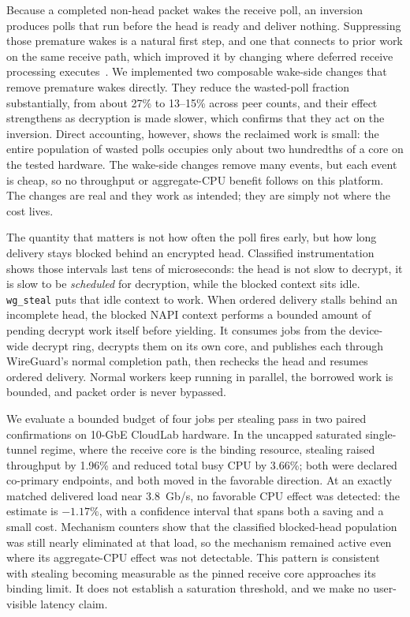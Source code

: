 Because a completed non-head packet wakes the receive poll, an inversion
produces polls that run before the head is ready and deliver nothing.
Suppressing those premature wakes is a natural first step, and one that connects
to prior work on the same receive path, which improved it by changing where
deferred receive processing executes~\cite{mounah2025}. We implemented two
composable wake-side changes that remove premature wakes directly. They reduce
the wasted-poll fraction substantially, from about 27\% to 13--15\% across peer
counts, and their effect strengthens as decryption is made slower, which
confirms that they act on the inversion. Direct accounting, however, shows the
reclaimed work is small: the entire population of wasted polls occupies only
about two hundredths of a core on the tested hardware. The wake-side changes
remove many events, but each event is cheap, so no throughput or aggregate-CPU
benefit follows on this platform. The changes are real and they work as
intended; they are simply not where the cost lives.

The quantity that matters is not how often the poll fires early, but how long
delivery stays blocked behind an encrypted head. Classified instrumentation
shows those intervals last tens of microseconds: the head is not slow to
decrypt, it is slow to be \emph{scheduled} for decryption, while the blocked
context sits idle. \texttt{wg\_steal} puts that idle context to work. When
ordered delivery stalls behind an incomplete head, the blocked NAPI context
performs a bounded amount of pending decrypt work itself before yielding. It
consumes jobs from the device-wide decrypt ring, decrypts them on its own core,
and publishes each through WireGuard's normal completion path, then rechecks the
head and resumes ordered delivery. Normal workers keep running in parallel, the
borrowed work is bounded, and packet order is never bypassed.

We evaluate a bounded budget of four jobs per stealing pass in two paired
confirmations on 10-GbE CloudLab hardware. In the uncapped saturated
single-tunnel regime, where the receive core is the binding resource, stealing
raised throughput by 1.96\% and reduced total busy CPU by 3.66\%; both were
declared co-primary endpoints, and both moved in the favorable direction. At an
exactly matched delivered load near 3.8~Gb/s, no favorable CPU effect was
detected: the estimate is $-1.17\%$, with a confidence interval that spans both
a saving and a small cost. Mechanism counters show that the classified
blocked-head population was still nearly eliminated at that load, so the
mechanism remained active even where its aggregate-CPU effect was not
detectable. This pattern is consistent with stealing becoming measurable as the
pinned receive core approaches its binding limit. It does not establish a
saturation threshold, and we make no user-visible latency claim.

